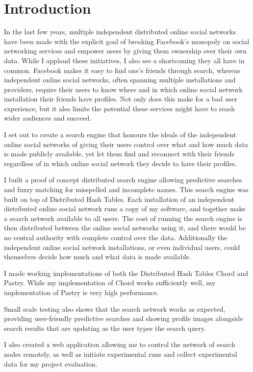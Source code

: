 


\chapter{Introduction}
In the last few years, multiple independent distributed online social networks have been made with the explicit goal of breaking Facebook's monopoly on social networking services and empower users by giving them ownership over their own data.
While I applaud these initiatives, I also see a shortcoming they all have in common. Facebook makes it easy to find one's friends through search, whereas independent online social networks, often spanning multiple installations and providers, require their users to know where and in which online social network installation their friends have profiles. Not only does this make for a bad user experience, but it also limits the potential these services might have to reach wider audiences and succeed.

I set out to create a search engine that honours the ideals of the independent online social networks of giving their users control over what and how much data is made publicly available, yet let them find and reconnect with their friends regardless of in which online social network they decide to have their profiles.

I built a proof of concept distributed search engine allowing predictive searches and fuzzy matching for misspelled and incomplete names. This search engine was built on top of Distributed Hash Tables. Each installation of an independent distributed online social network runs a copy of my software, and together make a search network available to all users. The cost of running the search engine is then distributed between the online social networks using it, and there would be no central authority with complete control over the data. Additionally the independent online social network installations, or even individual users, could themselves decide how much and what data is made available.

I made working implementations of both the Distributed Hash Tables Chord and Pastry. While my implementation of Chord works sufficiently well, my implementation of Pastry is very high performance.

Small scale testing also shows that the search network works as expected, providing user-friendly predictive searches and showing profile images alongside search results that are updating as the user types the search query.

I also created a web application allowing me to control the network of search nodes remotely, as well as initiate experimental runs and collect experimental data for my project evaluation.
